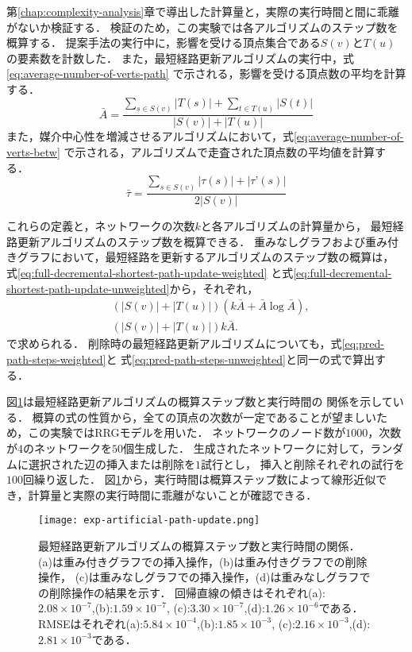 第\ref{chap:complexity-analysis}章で導出した計算量と，実際の実行時間と間に乖離がないか検証する．
検証のため，この実験では各アルゴリズムのステップ数を概算する．
提案手法の実行中に，影響を受ける頂点集合である$S(v)$と$T(u)$の要素数を計数した．
また，最短経路更新アルゴリズムの実行中，式\eqref{eq:average-number-of-verts-path}
で示される，影響を受ける頂点数の平均を計算する．
\begin{equation}
  \bar{A}=\frac{\sum_{s\in S(v)}|T(s)|+\sum_{t\in T(u)}|S(t)|}{|S(v)|+|T(u)|}
  \label{eq:average-number-of-verts-path}
\end{equation}
また，媒介中心性を増減させるアルゴリズムにおいて，式\eqref{eq:average-number-of-verts-betw}
で示される，アルゴリズムで走査された頂点数の平均値を計算する．
\begin{equation}
  \bar{\tau}=\frac{\sum_{s\in S(v)}|\tau(s)|+|\tau’(s)|}{2|S(v)|}
  \label{eq:average-number-of-verts-betw}
\end{equation}

これらの定義と，ネットワークの次数$k$と各アルゴリズムの計算量から，
最短経路更新アルゴリズムのステップ数を概算できる．
重みなしグラフおよび重み付きグラフにおいて，最短経路を更新するアルゴリズムのステップ数の概算は，
式\eqref{eq:full-decremental-shortest-path-update-weighted}
と式\eqref{eq:full-decremental-shortest-path-update-unweighted}から，それぞれ，
\begin{align}
  &(|S(v)|+|T(u)|)(k\bar{A}+\bar{A}\log\bar{A}),
  \label{eq:pred-path-steps-weighted} \\
  &(|S(v)|+|T(u)|)k\bar{A}.
  \label{eq:pred-path-steps-unweighted}
\end{align}
で求められる．
削除時の最短経路更新アルゴリズムについても，式\ref{eq:pred-path-steps-weighted}と
式\ref{eq:pred-path-steps-unweighted}と同一の式で算出する．

図\ref{fig:exp-artificial-path-update}は最短経路更新アルゴリズムの概算ステップ数と実行時間の
関係を示している．
概算の式の性質から，全ての頂点の次数が一定であることが望ましいため，この実験ではRRGモデルを用いた．
ネットワークのノード数が$1000$，次数が$4$のネットワークを$50$個生成した．
生成されたネットワークに対して，ランダムに選択された辺の挿入または削除を$1$試行とし，
挿入と削除それぞれの試行を$100$回繰り返した．
図\ref{fig:exp-artificial-path-update}から，実行時間は概算ステップ数によって線形近似でき，計算量と実際の実行時間に乖離がないことが確認できる．

\begin{figure}
  \centering
  \texttt{[image: exp-artificial-path-update.png]}
  \caption{
    最短経路更新アルゴリズムの概算ステップ数と実行時間の関係．
    (a)は重み付きグラフでの挿入操作，(b)は重み付きグラフでの削除操作，
    (c)は重みなしグラフでの挿入操作，(d)は重みなしグラフでの削除操作の結果を示す．
    回帰直線の傾きはそれぞれ(a):$2.08\times10^{-7}$,(b):$1.59\times10^{-7}$,
    (c):$3.30\times10^{-7}$,(d):$1.26\times10^{-6}$である．
    RMSEはそれぞれ(a):$5.84\times10^{-4}$,(b):$1.85\times10^{-3}$,
    (c):$2.16\times10^{-3}$,(d):$2.81\times10^{-3}$である．
  }
  \label{fig:exp-artificial-path-update}
\end{figure}


